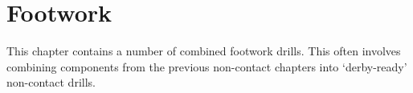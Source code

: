 \chapter{Footwork}
\label{ch:footwork}

This chapter contains a number of combined footwork drills.
This often involves combining components from the previous non-contact chapters into `derby-ready' non-contact drills.



